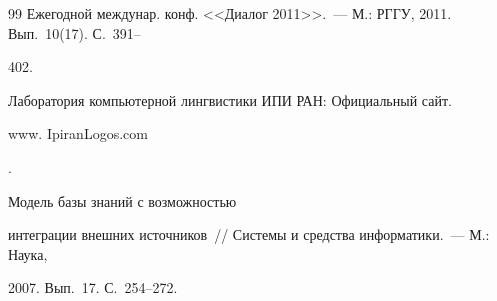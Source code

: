 {{\begin{thebibliography}{99}
Ежегодной междунар. конф. <<Диалог 2011>>.~--- М.: РГГУ, 2011. Вып.~10(17). С.~391--


402.


 


     


     


         \label{end\stat}


          




     Лаборатория компьютерной лингвистики ИПИ РАН: Официальный сайт. {\sf 


www. IpiranLogos.com}.







      Модель базы знаний с возможностью 


интеграции внешних источников~/\!\!/ Системы и средства информатики.~--- М.: Наука, 


2007. Вып.~17. С.~254--272.


 \end{thebibliography}


}


}


